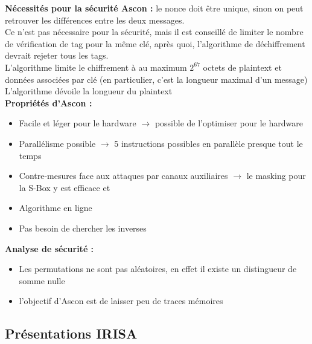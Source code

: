 \documentclass[12pt]{article}
\begin{document}
	\noindent \textbf{Nécessités pour la sécurité Ascon :} le nonce doit être unique, sinon on peut retrouver les différences entre les deux messages.\\
	Ce n'est pas nécessaire pour la sécurité, mais il est conseillé de limiter le nombre de vérification de tag pour la même clé, après quoi, l'algorithme de déchiffrement devrait rejeter tous les tags.\\
	L'algorithme limite le chiffrement à au maximum $2^{67}$ octets de plaintext et données associées par clé (en particulier, c'est la longueur maximal d'un message)\\
	\warning L'algorithme dévoile la longueur du plaintext\\
	
	\noindent \textbf{Propriétés d'Ascon :}\begin{itemize}
		\item Facile et léger pour le hardware $\rightarrow$ possible de l'optimiser pour le hardware
		\item Parallélisme possible $\rightarrow$ 5 instructions possibles en parallèle presque tout le temps
		\item Contre-mesures face aux attaques par canaux auxiliaires $\rightarrow$ le masking pour la S-Box y est efficace et 
		\item Algorithme en ligne
		\item Pas besoin de chercher les inverses
	\end{itemize}
	
	\noindent \textbf{Analyse de sécurité :}\begin{itemize}
		\item Les permutations ne sont pas aléatoires, en effet il existe un distingueur de somme nulle
		\item l'objectif d'Ascon est de laisser peu de traces mémoires
	\end{itemize}
	
	\subsection{Présentations IRISA}  
\end{document}
